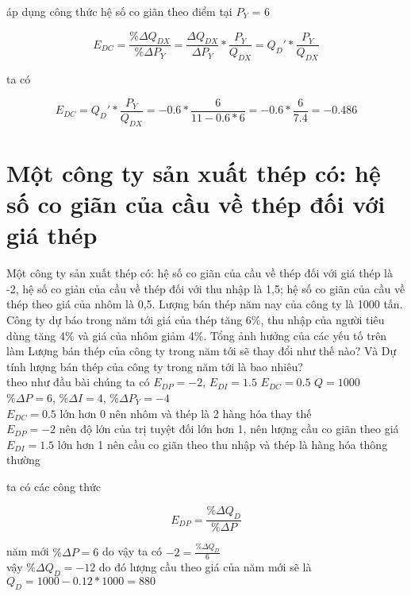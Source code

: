 \begin{enumerate}
\begin{enumerate}[a.]
                áp dụng công thức hệ số co giãn theo điểm tại $P_Y$ = 6

                \[ E_{DC} = \frac{\% \Delta Q_{DX}}{\% \Delta P_{Y}}
                  =  \frac{ \Delta Q_{DX}}{\Delta P_{Y}} * \frac{P_{Y}}{Q_{DX}}
                  = Q_D' *  \frac{P_{Y}}{Q_{DX}} \]

                ta có

                \[ E_{DC} = Q_D' *  \frac{P_{Y}}{Q_{DX}}
                  = -0.6 *  \frac{6}{11 - 0.6 * 6}
                  = -0.6 * \frac{6}{7.4} = -0.486 \]
        \end{enumerate}


\end{enumerate}

\section{ Một công ty sản xuất thép có: hệ số co giãn của cầu về thép đối với giá thép}

Một công ty sản xuất thép có: hệ số co giãn của cầu về thép đối với giá thép là -2, hệ
số co giản của cầu về thép đối với thu nhập là 1,5; hệ số co giãn của cầu về thép theo giá của
nhôm là 0,5. Lượng bán thép năm nay của công ty là 1000 tấn. Công ty dự báo trong năm tới
giá của thép tăng 6\%, thu nhập của người tiêu dùng tăng 4\% và giá của nhôm giảm 4\%. Tổng
ảnh hưởng của các yếu tố trên làm Lượng bán thép của công ty trong năm tới sẽ thay đổi
như thế nào? Và Dự tính lượng bán thép của công ty trong năm tới là bao nhiêu?
\\


theo như đầu bài chúng ta có
$E_{DP} = -2$,  $E_{DI} = 1.5$ $E_{DC} = 0.5$ $Q = 1000$ \\
$\% \Delta P = 6$, $\% \Delta I = 4$, $\% \Delta P_Y = -4$
\\
$E_{DC} = 0.5$ lớn hơn 0 nên nhôm và thép là 2 hàng hóa thay thế \\
$E_{DP} = -2$ nên độ lớn của trị tuyệt đối lớn hơn 1, nên lượng cầu co giãn theo giá \\
$E_{DI} = 1.5$ lớn hơn 1 nên cầu co giãn theo thu nhập và thép là hàng hóa thông thường


ta có các công thức

\[ E_{DP} = \frac{\%\Delta Q_D}{\%\Delta P}\]

năm mới $\%\Delta P = 6$ do vậy ta có $-2 = \frac{\%\Delta Q_D}{6}$ \\
vậy $\%\Delta Q_D = -12$ do đó lượng cầu theo giá của năm mới sẽ là \\
$Q_D = 1000 - 0.12 * 1000 = 880$

